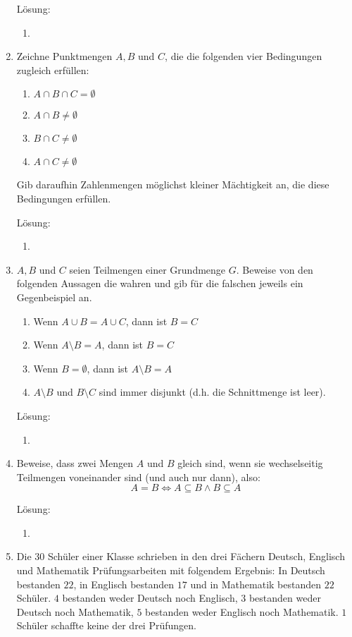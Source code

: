 \documentclass[../main.tex]{subfiles}
\begin{document}
\begin{enumerate}
	      Lösung:
	      \begin{enumerate}
		      \item
	      \end{enumerate}
	\item Zeichne Punktmengen \( A, B \) und \( C \), die die folgenden vier Bedingungen
	      zugleich erfüllen:
	      \begin{enumerate}
		      \item \( A \cap B \cap C = \emptyset \)
		      \item \( A \cap B \neq \emptyset \)
		      \item \( B \cap C \neq \emptyset \)
		      \item \( A \cap C \neq \emptyset \)
	      \end{enumerate}
	      Gib daraufhin Zahlenmengen möglichst kleiner Mächtigkeit an, die diese
	      Bedingungen erfüllen.

	      Lösung:
	      \begin{enumerate}
		      \item
	      \end{enumerate}
	\item \( A, B \) und \( C \) seien Teilmengen einer Grundmenge \( G \).
	      Beweise von den folgenden Aussagen die wahren und gib für die falschen jeweils ein Gegenbeispiel an.
	      \begin{enumerate}
		      \item Wenn \( A \cup B = A \cup C \), dann ist \( B = C \)
		      \item Wenn \( A \setminus B = A \), dann ist \( B = C \)
		      \item Wenn \( B = \emptyset \), dann ist \(  A \setminus B  = A \)
		      \item \( A \setminus B  \) und \( B \setminus C \) sind immer disjunkt
		            (d.h. die Schnittmenge ist leer).
	      \end{enumerate}

	      Lösung:
	      \begin{enumerate}
		      \item
	      \end{enumerate}
	\item Beweise, dass zwei Mengen \( A \) und \( B \) gleich sind,
	      wenn sie wechselseitig Teilmengen voneinander sind (und auch nur dann),
	      also:
	      \[ A = B \Leftrightarrow A \subseteq B \land B \subseteq A \]

	      Lösung:
	      \begin{enumerate}
		      \item
	      \end{enumerate}
	\item Die \( 30 \) Schüler einer Klasse schrieben in den drei Fächern
	      Deutsch, Englisch und Mathematik Prüfungsarbeiten mit folgendem Ergebnis:
	      In Deutsch bestanden \( 22 \), in Englisch bestanden \( 17 \)
	      und in Mathematik bestanden \( 22 \) Schüler.
	      \( 4 \) bestanden weder Deutsch noch Englisch,
	      \( 3 \) bestanden weder Deutsch noch Mathematik,
	      \( 5 \) bestanden weder Englisch noch Mathematik.
	      \( 1 \) Schüler schaffte keine der drei Prüfungen.


\end{enumerate}
\end{document}
